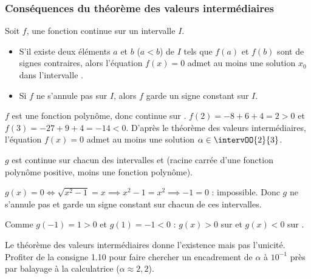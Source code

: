 \subsubsection{Conséquences du théorème des valeurs intermédiaires}\vspace*{-0.3cm}
\begin{propriete}[s]
	Soit $f$, une fonction continue sur un intervalle $I$.
\begin{itemize}
	\item S'il existe deux éléments $a$ et $b$ ($a<b
	$) de $I$ tels que $f(a)$ et $f(b)$ sont de signes contraires, alors l'équation $f(x)=0$ admet au moins une solution $x_0$ dans l'intervalle .
	\item Si $f$ ne s'annule pas sur $I$, alors $f$ garde un signe constant sur $I$.
\end{itemize}
\end{propriete}
\fi %
\begin{corrigeprof}[10]
\be
\item $f$ est une fonction polynôme, donc continue sur . $f(2)=-8+6+4=2>0$ et $f(3)=-27+9+4=-14<0$. D'après le théorème des valeurs intermédiaires, l'équation $f(x)=0$ admet au moins une solution $\alpha\in\intervOO{2}{3}$.
\item $g$ est continue sur chacun des intervalles  et  (racine carrée d'une fonction polynôme positive, moins une fonction polynôme).
\par $g(x)=0\iff\sqrt{x^2-1}=x\implies x^2-1=x^2\implies -1=0$ : impossible. Donc $g$ ne s'annule pas et garde un signe constant sur chacun de ces intervalles.
\par Comme $g(-1)=1>0$ et $g(1)=-1<0$ : $g(x)>0$ sur  et $g(x)<0$ sur .
\ee
\end{corrigeprof}
\begin{noteprof}
Le théorème des valeurs intermédiaires donne l'existence mais pas l'unicité. Profiter de la consigne 1.10 pour faire chercher un encadrement de $\alpha$ à $10^{-1}$ près par balayage à la calculatrice ($\alpha\approx 2{,}2$).
\end{noteprof}
\ifenseignant %
